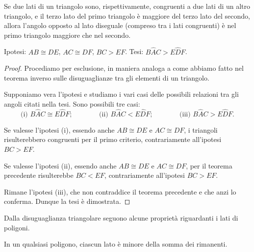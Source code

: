 \begin{teorema}
Se due lati di un triangolo sono, rispettivamente, congruenti a due lati di un altro triangolo, e il terzo lato del primo triangolo è maggiore del terzo lato del secondo, allora l'angolo opposto al lato diseguale (compreso tra i lati congruenti) è nel primo triangolo maggiore che nel secondo.
\end{teorema}

\noindent Ipotesi: $AB\cong DE$, $AC\cong DF$, $BC>EF$. Tesi: $B\widehat{A}C>E\widehat{D}F$.

\begin{figure}[htb]
\centering
\end{figure}

\begin{proof}
Procediamo per esclusione, in maniera analoga a come abbiamo fatto nel teorema inverso sulle disuguaglianze tra gli elementi di un triangolo.

Supponiamo vera l'ipotesi e studiamo i vari casi delle possibili relazioni tra gli angoli citati nella tesi. Sono possibili tre casi:
\[\text{(i) }B\widehat{A}C\cong E\widehat{D}F\text{;}\qquad\qquad \text{(ii) }B\widehat{A}C<E\widehat{D}F\text{;}\qquad\qquad \text{(iii) }B\widehat{A}C>E\widehat{D}F\text{.}\]

Se valesse l'ipotesi (i), essendo anche $AB\cong DE$ e $AC\cong DF$, i triangoli risulterebbero congruenti per il primo criterio, contrariamente all'ipotesi $BC>EF$.

Se valesse l'ipotesi (ii), essendo anche $AB\cong DE$ e $AC\cong DF$, per il teorema precedente risulterebbe $BC<EF$, contrariamente all'ipotesi $BC>EF$.

Rimane l'ipotesi (iii), che non contraddice il teorema precedente e che anzi lo conferma. Dunque la tesi è dimostrata.
\end{proof}

Dalla disuguaglianza triangolare seguono alcune proprietà riguardanti i lati di poligoni.

\begin{teorema}
In un qualsiasi poligono, ciascun lato è minore della somma dei rimanenti.
\end{teorema}

